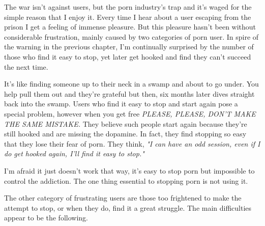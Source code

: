 \documentclass[easypeasy.tex]{subfiles}
\begin{document}
The war isn't against users, but the porn industry's trap and it's waged for the simple reason that I enjoy it. Every time I hear about a user escaping from the prison I get a feeling of immense pleasure. But this pleasure hasn't been without considerable frustration, mainly caused by two categories of porn user. In spire of the warning in the previous chapter, I'm continually surprised by the number of those who find it easy to stop, yet later get hooked and find they can't succeed the next time.

It's like finding someone up to their neck in a swamp and about to go under. You help pull them out and they're grateful but then, six months later dives straight back into the swamp. Users who find it easy to stop and start again pose a special problem, however when you get free \textit{PLEASE, PLEASE, DON'T MAKE THE SAME MISTAKE.} They believe such people start again because they're still hooked and are missing the dopamine. In fact, they find stopping so easy that they lose their fear of porn. They think, \textit{"I can have an odd session, even if I do get hooked again, I'll find it easy to stop."}

I'm afraid it just doesn't work that way, it's easy to stop porn but impossible to control the addiction. The one thing essential to stopping porn is not using it.

The other category of frustrating users are those too frightened to make the attempt to stop, or when they do, find it a great struggle. The main difficulties appear to be the following.
\end{document}
